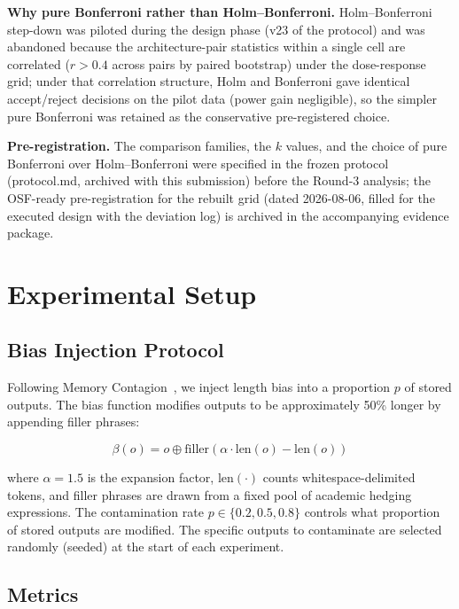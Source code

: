 \documentclass[11pt]{article}
\begin{document}
\textbf{Why pure Bonferroni rather than Holm--Bonferroni.} Holm--Bonferroni step-down was piloted during the design phase (v23 of the protocol) and was abandoned because the architecture-pair statistics within a single cell are correlated ($r > 0.4$ across pairs by paired bootstrap) under the dose-response grid; under that correlation structure, Holm and Bonferroni gave identical accept/reject decisions on the pilot data (power gain negligible), so the simpler pure Bonferroni was retained as the conservative pre-registered choice.

\textbf{Pre-registration.} The comparison families, the $k$ values, and the choice of pure Bonferroni over Holm--Bonferroni were specified in the frozen protocol (protocol.md, archived with this submission) before the Round-3 analysis; the OSF-ready pre-registration for the rebuilt grid (dated 2026-08-06, filled for the executed design with the deviation log) is archived in the accompanying evidence package.


\section{Experimental Setup}
\label{sec:experimental-setup}

\subsection{Bias Injection Protocol}

Following Memory Contagion~\cite{memorycontagion2026}, we inject length bias into a proportion $p$ of stored outputs. The bias function modifies outputs to be approximately 50\% longer by appending filler phrases:

\begin{equation}
\beta(o) = o \oplus \text{filler}(\alpha \cdot \text{len}(o) - \text{len}(o))
\end{equation}

where $\alpha = 1.5$ is the expansion factor, $\text{len}(\cdot)$ counts whitespace-delimited tokens, and filler phrases are drawn from a fixed pool of academic hedging expressions. The contamination rate $p \in \{0.2, 0.5, 0.8\}$ controls what proportion of stored outputs are modified. The specific outputs to contaminate are selected randomly (seeded) at the start of each experiment.

\subsection{Metrics}
\end{document}
